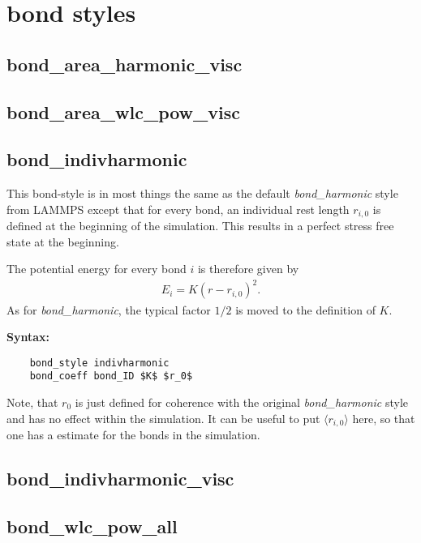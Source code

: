 \section{bond styles}

\subsection{bond\_area\_harmonic\_visc}

\subsection{bond\_area\_wlc\_pow\_visc}

\subsection{bond\_indivharmonic}
\label{sub:fix_indivharmonic}

This bond-style is in most things the same as the default \emph{bond\_harmonic} style from LAMMPS except that for every bond, an individual rest length $r_{i,0}$ is defined at the beginning of the simulation. This results in a perfect stress free state at the beginning.

The potential energy for every bond $i$ is therefore given by
\begin{align}
  E_i = K \left(r-r_{i,0}\right)^2.
\end{align}
As for \emph{bond\_harmonic}, the typical factor $1/2$ is moved to the definition of $K$. 

{\bfseries Syntax:}

\begin{lstlisting}
    bond_style indivharmonic
    bond_coeff bond_ID $K$ $r_0$
\end{lstlisting}
Note, that $r_0$ is just defined for coherence with the original \emph{bond\_harmonic} style and has no effect within the simulation. It can be useful to put $\langle r_{i,0} \rangle$ here, so that one has a estimate for the bonds in the simulation.



\subsection{bond\_indivharmonic\_visc}

\subsection{bond\_wlc\_pow\_all}

